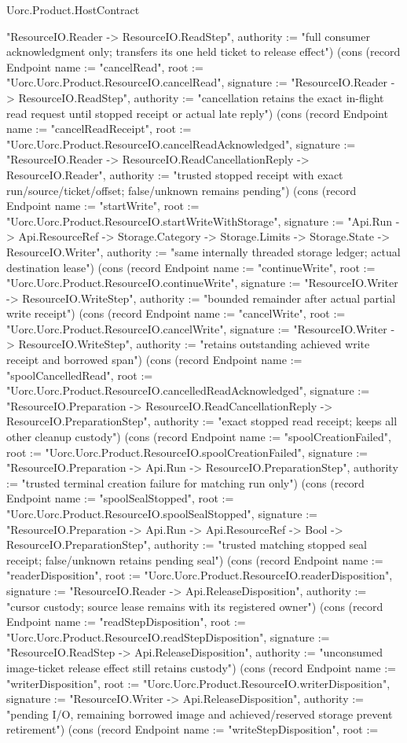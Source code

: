 \begin{lexlean}{Uorc.Product.HostContract}
\begin{semanticmodule}
{"ResourceIO.Reader -> ResourceIO.ReadStep", authority := "full consumer acknowledgment only; transfers its one held ticket to release effect"}) (cons (record Endpoint {name := "cancelRead", root := "Uorc.Uorc.Product.ResourceIO.cancelRead", signature := "ResourceIO.Reader -> ResourceIO.ReadStep", authority := "cancellation retains the exact in-flight read request until stopped receipt or actual late reply"}) (cons (record Endpoint {name := "cancelReadReceipt", root := "Uorc.Uorc.Product.ResourceIO.cancelReadAcknowledged", signature := "ResourceIO.Reader -> ResourceIO.ReadCancellationReply -> ResourceIO.Reader", authority := "trusted stopped receipt with exact run/source/ticket/offset; false/unknown remains pending"}) (cons (record Endpoint {name := "startWrite", root := "Uorc.Uorc.Product.ResourceIO.startWriteWithStorage", signature := "Api.Run -> Api.ResourceRef -> Storage.Category -> Storage.Limits -> Storage.State -> ResourceIO.Writer", authority := "same internally threaded storage ledger; actual destination lease"}) (cons (record Endpoint {name := "continueWrite", root := "Uorc.Uorc.Product.ResourceIO.continueWrite", signature := "ResourceIO.Writer -> ResourceIO.WriteStep", authority := "bounded remainder after actual partial write receipt"}) (cons (record Endpoint {name := "cancelWrite", root := "Uorc.Uorc.Product.ResourceIO.cancelWrite", signature := "ResourceIO.Writer -> ResourceIO.WriteStep", authority := "retains outstanding achieved write receipt and borrowed span"}) (cons (record Endpoint {name := "spoolCancelledRead", root := "Uorc.Uorc.Product.ResourceIO.cancelledReadAcknowledged", signature := "ResourceIO.Preparation -> ResourceIO.ReadCancellationReply -> ResourceIO.PreparationStep", authority := "exact stopped read receipt; keeps all other cleanup custody"}) (cons (record Endpoint {name := "spoolCreationFailed", root := "Uorc.Uorc.Product.ResourceIO.spoolCreationFailed", signature := "ResourceIO.Preparation -> Api.Run -> ResourceIO.PreparationStep", authority := "trusted terminal creation failure for matching run only"}) (cons (record Endpoint {name := "spoolSealStopped", root := "Uorc.Uorc.Product.ResourceIO.spoolSealStopped", signature := "ResourceIO.Preparation -> Api.Run -> Api.ResourceRef -> Bool -> ResourceIO.PreparationStep", authority := "trusted matching stopped seal receipt; false/unknown retains pending seal"}) (cons (record Endpoint {name := "readerDisposition", root := "Uorc.Uorc.Product.ResourceIO.readerDisposition", signature := "ResourceIO.Reader -> Api.ReleaseDisposition", authority := "cursor custody; source lease remains with its registered owner"}) (cons (record Endpoint {name := "readStepDisposition", root := "Uorc.Uorc.Product.ResourceIO.readStepDisposition", signature := "ResourceIO.ReadStep -> Api.ReleaseDisposition", authority := "unconsumed image-ticket release effect still retains custody"}) (cons (record Endpoint {name := "writerDisposition", root := "Uorc.Uorc.Product.ResourceIO.writerDisposition", signature := "ResourceIO.Writer -> Api.ReleaseDisposition", authority := "pending I/O, remaining borrowed image and achieved/reserved storage prevent retirement"}) (cons (record Endpoint {name := "writeStepDisposition", root := }
\end{semanticmodule}
\end{lexlean}
